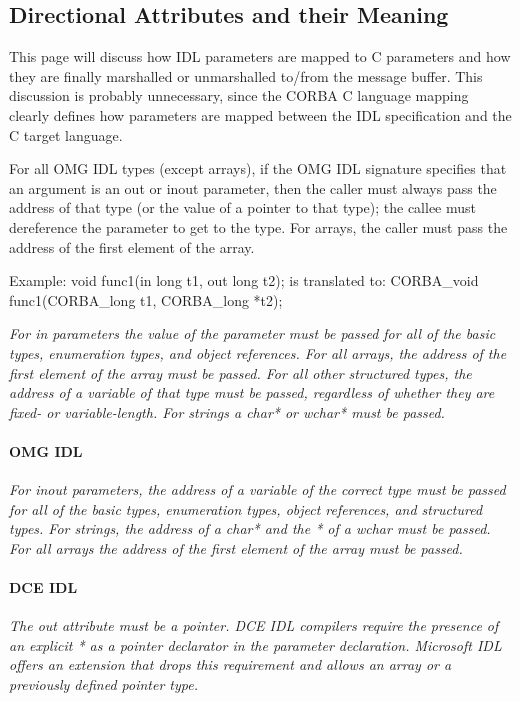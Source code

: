 \subsection{Directional Attributes and their Meaning}

This page will discuss how IDL parameters are mapped to C parameters
and how they are finally marshalled or unmarshalled to/from the
message buffer. This discussion is probably unnecessary, since the
CORBA C language mapping clearly defines how parameters are mapped
between the IDL specification and the C target language.

For all OMG IDL types (except arrays), if the OMG IDL signature
specifies that an argument is an out or inout parameter, then the
caller must always pass the address of that type (or the value of a
pointer to that type); the callee must dereference the parameter to
get to the type. For arrays, the caller must pass the address of the
first element of the array.

Example:
void func1(in long t1, out long t2);
is translated to:
CORBA_void func1(CORBA_long t1, CORBA_long *t2);

{\em For in parameters the value of the parameter must be passed for
all of the basic types, enumeration types, and object references. For
all arrays, the address of the first element of the array must be
passed. For all other structured types, the address of a variable of
that type must be passed, regardless of whether they are fixed- or
variable-length. For strings a char* or wchar* must be passed.}

\paragraph{OMG IDL}
{\em For inout parameters, the address of a variable of the correct
type must be passed for all of the basic types, enumeration types,
object references, and structured types. For strings, the address of a
char* and the * of a wchar must be passed. For all arrays the address
of the first element of the array must be passed.}

\paragraph{DCE IDL}
{\em The out attribute must be a pointer. DCE IDL compilers require
the presence of an explicit * as a pointer declarator in the parameter
declaration. Microsoft IDL offers an extension that drops this
requirement and allows an array or a previously defined pointer type.}


